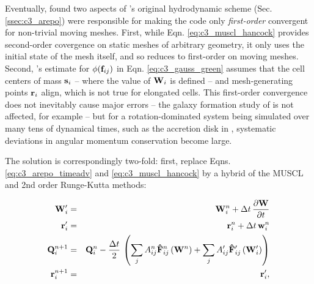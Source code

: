 
Eventually, \cite{pakm+16} found two aspects of \arepo's original hydrodynamic scheme (Sec. \ref{ssec:c3_arepo}) were responsible for making the code only \textit{first-order} convergent for non-trivial moving meshes.  First, while Eqn. \ref{eq:c3_muscl_hancock} provides second-order covergence on static meshes of arbitrary geometry, it only uses the initial state of the mesh itself, and so reduces to first-order on moving meshes.  Second, \arepo's estimate for $\phi({\bf f}_{ij})$ in Eqn. \ref{eq:c3_gauss_green} assumes that the cell centers of mass ${\bf s}_i$ -- where the value of ${\bf W}_i$ is defined -- and mesh-generating points ${\bf r}_i$ align, which is not true for elongated cells.  This first-order convergence does not inevitably cause major errors -- the galaxy formation study of \cite{marips14} is not affected, for example -- but for a rotation-dominated system being simulated over many tens of dynamical times, such as the accretion disk in \cite{pakm+16}, systematic deviations in angular momentum conservation become large.

The solution is correspondingly two-fold: first, replace Eqns. \ref{eq:c3_arepo_timeadv} and \ref{eq:c3_muscl_hancock} by a hybrid of the MUSCL and 2nd order Runge-Kutta methods:

\begin{eqnarray}
{\bf W}^\prime_i &=& {\bf W}^n_i + \Delta t \, \frac{\partial {\bf W}}{\partial t} \nonumber \\
{\bf r}_i^\prime &=& {\bf r}_i^n +  \Delta t \, {\bf w}_i^n \nonumber \\
{\bf Q}^{n+1}_i &=& {\bf Q}^n_i - \frac{\Delta t}{2} \, \left( \sum_j A^n_{ij} {\bf \hat{F}}_{ij}^{n} \left( {\bf W}^n \right) + \sum_j A^\prime_{ij} {\bf \hat{F}}_{ij}^{\prime} \left( {\bf W}_i^\prime \right) \right) \nonumber \\
{\bf r}_i^{n+1} &=& {\bf r}_i^\prime,
\end{eqnarray}

